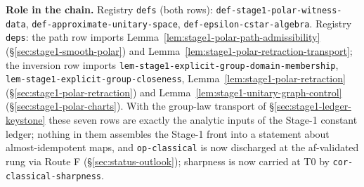 \noindent\textbf{Role in the chain.} Registry \texttt{defs} (both rows):
\texttt{def-stage1-polar-witness-data}, \texttt{def-approximate-unitary-space},
\texttt{def-epsilon-cstar-algebra}. Registry \texttt{deps}: the path row imports
Lemma~\ref{lem:stage1-polar-path-admissibility} (\S\ref{sec:stage1-smooth-polar}) and
Lemma~\ref{lem:stage1-polar-retraction-transport}; the inversion row imports
\texttt{lem-stage1-explicit-group-domain-membership},
\texttt{lem-stage1-explicit-group-closeness},
Lemma~\ref{lem:stage1-polar-retraction} (\S\ref{sec:stage1-polar-retraction}) and
Lemma~\ref{lem:stage1-unitary-graph-control} (\S\ref{sec:stage1-polar-charts}). With the
group-law transport of \S\ref{sec:stage1-ledger-keystone} these seven rows are exactly the
analytic inputs of the Stage-1 constant ledger; nothing in them assembles the Stage-1 front
into a statement about almost-idempotent maps, and \texttt{op-classical} is now discharged at the af-validated rung via Route F (\S\ref{sec:status-outlook}); sharpness is now carried at T0 by \texttt{cor-classical-sharpness}.
